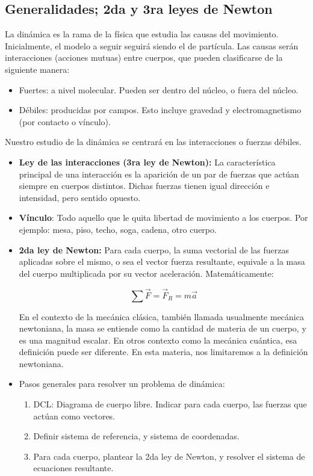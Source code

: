\documentclass{article}
\begin{document}
\subsection{Generalidades; 2da y 3ra leyes de Newton}

La dinámica es la rama de la física que estudia las causas del movimiento. Inicialmente, el modelo a seguir seguirá siendo el de partícula. Las causas serán interacciones (acciones mutuas) entre cuerpos, que pueden clasificarse de la siguiente manera:

\begin{itemize}
\item Fuertes: a nivel molecular. Pueden ser dentro del núcleo, o fuera del núcleo.
\item Débiles: producidas por campos. Esto incluye gravedad y electromagnetismo (por contacto o vínculo).
\end{itemize}

Nuestro estudio de la dinámica se centrará en las interacciones o fuerzas débiles.

\begin{itemize}
\item \textbf{Ley de las interacciones (3ra ley de Newton):} La característica principal de una interacción es la aparición de un par de fuerzas que actúan siempre en cuerpos distintos. Dichas fuerzas tienen igual dirección e intensidad, pero sentido opuesto.
\item \textbf{Vínculo}: Todo aquello que le quita libertad de movimiento a los cuerpos. Por ejemplo: mesa, piso, techo, soga, cadena, otro cuerpo.
\item \textbf{2da ley de Newton:} Para cada cuerpo, la suma vectorial de las fuerzas aplicadas sobre el mismo, o sea el vector fuerza resultante, equivale a la masa del cuerpo multiplicada por su vector aceleración. Matemáticamente:

\begin{equation}
\sum \vec{F} = \vec{F}_R = m \vec{a}
\end{equation}

En el contexto de la mecánica clásica, también llamada usualmente mecánica newtoniana, la masa se entiende como la cantidad de materia de un cuerpo, y es una magnitud escalar. En otros contexto como la mecánica cuántica, esa definición puede ser diferente. En esta materia, nos limitaremos a la definición newtoniana.

\item Pasos generales para resolver un problema de dinámica:

\begin{enumerate}
\item DCL: Diagrama de cuerpo libre. Indicar para cada cuerpo, las fuerzas que actúan como vectores.
\item Definir sistema de referencia, y sistema de coordenadas.
\item Para cada cuerpo, plantear la 2da ley de Newton, y resolver el sistema de ecuaciones resultante.
\end{enumerate}

\end{itemize}
\end{document}

